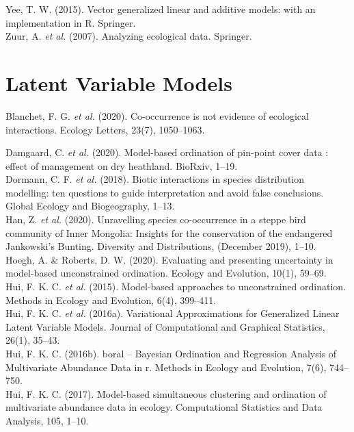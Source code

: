 \documentclass{article}
\begin{document}
Yee, T. W. (2015). Vector generalized linear and additive models: with an implementation in R. Springer.\\

Zuur, A. \textit{et al.} (2007). Analyzing ecological data. Springer.\\

\section{Latent Variable Models}

Blanchet, F. G. \textit{et al.} (2020). Co-occurrence is not evidence of ecological interactions. Ecology Letters, 23(7), 1050–1063.

Damgaard, C. \textit{et al.} (2020). Model-based ordination of pin-point cover data : effect of management on dry heathland. BioRxiv, 1–19.\\

Dormann, C. F. \textit{et al.} (2018). Biotic interactions in species distribution modelling: ten questions to guide interpretation and avoid false conclusions. Global Ecology and Biogeography, 1–13.\\

Han, Z. \textit{et al.} (2020). Unravelling species co-occurrence in a steppe bird community of Inner Mongolia: Insights for the conservation of the endangered Jankowski’s Bunting. Diversity and Distributions, (December 2019), 1–10.\\

Hoegh, A. \& Roberts, D. W. (2020). Evaluating and presenting uncertainty in model-based unconstrained ordination. Ecology and Evolution, 10(1), 59–69.\\

Hui, F. K. C. \textit{et al.} (2015). Model-based approaches to unconstrained ordination. Methods in Ecology and Evolution, 6(4), 399–411.\\

Hui, F. K. C. \textit{et al.} (2016a). Variational Approximations for Generalized Linear Latent Variable Models. Journal of Computational and Graphical Statistics, 26(1), 35–43.\\ 

Hui, F. K. C. (2016b). boral – Bayesian Ordination and Regression Analysis of Multivariate Abundance Data in r. Methods in Ecology and Evolution, 7(6), 744–750.\\

Hui, F. K. C. (2017). Model-based simultaneous clustering and ordination of multivariate abundance data in ecology. Computational Statistics and Data Analysis, 105, 1–10. \\
\end{document}
